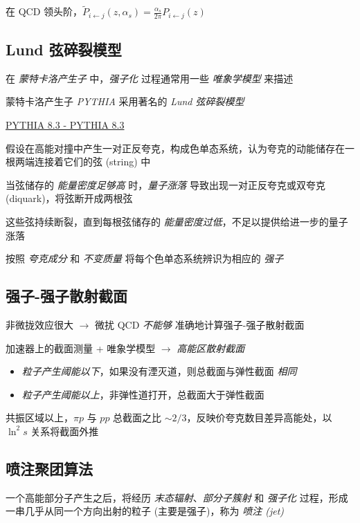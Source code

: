 在 QCD 领头阶，$\tilde{P}_{i \gets j} (z, \alpha_s) = \frac{\alpha_s}{2\pi} P_{i \gets j} (z)$

\subsection{Lund 弦碎裂模型}

在 \emph{蒙特卡洛产生子} 中，\emph{强子化} 过程通常用一些 \emph{唯象学模型} 来描述

蒙特卡洛产生子 \emph{PYTHIA} 采用著名的 \emph{Lund 弦碎裂模型}

\href{https://pythia.org/}{PYTHIA 8.3 - PYTHIA 8.3}

假设在高能对撞中产生一对正反夸克，构成色单态系统，认为夸克的动能储存在一根两端连接着它们的弦 (string) 中

当弦储存的 \emph{能量密度足够高} 时，\emph{量子涨落} 导致出现一对正反夸克或双夸克 (diquark)，将弦断开成两根弦

这些弦持续断裂，直到每根弦储存的 \emph{能量密度过低}，不足以提供给进一步的量子涨落

按照 \emph{夸克成分} 和 \emph{不变质量} 将每个色单态系统辨识为相应的 \emph{强子}

\subsection{强子-强子散射截面}

非微拢效应很大 $\to$ 微扰 QCD \emph{不能够} 准确地计算强子-强子散射截面

加速器上的截面测量 + 唯象学模型 $\to$ \emph{高能区散射截面}

\begin{itemize}
    \item \emph{粒子产生阈能以下}，如果没有湮灭道，则总截面与弹性截面 \emph{相同}
    \item \emph{粒子产生阈能以上}，非弹性道打开，总截面大于弹性截面
\end{itemize}

共振区域以上，$\pi p$ 与 $pp$ 总截面之比 $\sim 2/3$，反映价夸克数目差异高能处，以 $\ln^2s$ 关系将截面外推

\subsection{喷注聚团算法}

一个高能部分子产生之后，将经历 \emph{末态辐射}、\emph{部分子簇射} 和 \emph{强子化} 过程，形成一串几乎从同一个方向出射的粒子 (主要是强子)，称为 \emph{喷注 (jet)}

